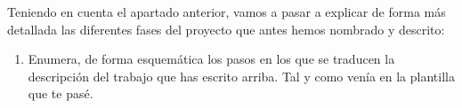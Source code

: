 \documentclass[12pt,oneside,a4paper]{article}
\begin{document}
Teniendo en cuenta el apartado anterior, vamos a pasar a explicar de forma más detallada las diferentes fases del proyecto que antes hemos nombrado y descrito:

\begin{enumerate}
 \item Enumera, de forma esquemática los pasos en los que se traducen la descripción del trabajo que has escrito arriba. Tal y como venía en la plantilla que te pasé.
\end{enumerate}



 








\end{document}
